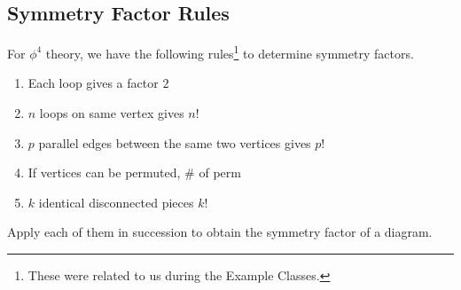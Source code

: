 \subsection*{Symmetry Factor Rules}%
\label{sub:symmetry_factor_rules}
For $\phi^4$ theory, we have the following rules\footnote{ These were related to us during the Example Classes.} to determine symmetry factors.
\begin{enumerate}[1)]
  \item Each loop gives a factor $2$
  \item $n$ loops on same vertex gives $n!$
  \item $p$ parallel edges between the same two vertices gives $p!$
  \item If vertices can be permuted, $\#$ of perm
  \item $k$ identical disconnected pieces $k!$
\end{enumerate}
Apply each of them in succession to obtain the symmetry factor of a diagram.
